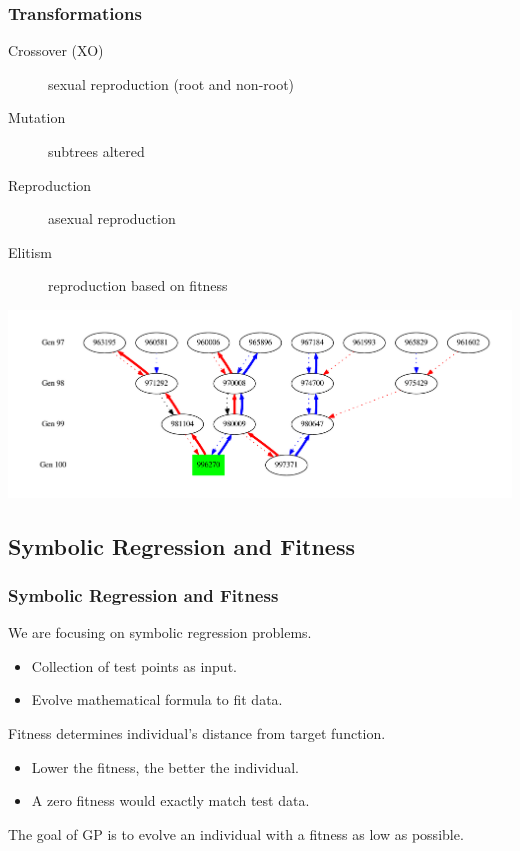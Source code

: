 \documentclass{beamer}
\newcommand{\linespace}{\vskip 0.25cm}
\begin{document}
\begin{frame}
  \frametitle{Transformations}

		\begin{description}
		\item[Crossover (XO)] sexual reproduction (root and non-root)
		\item[Mutation] subtrees altered
		\item[Reproduction] asexual reproduction
		\item[Elitism] reproduction based on fitness
		\end{description}
\includegraphics[width=.95\textwidth]{XO_path_example.pdf}
\end{frame}

\subsection{Symbolic Regression and Fitness}

\begin{frame}
	\frametitle{Symbolic Regression and Fitness}
	
	We are focusing on symbolic regression problems.
	\begin{itemize}
		\item Collection of test points as input.
		\item Evolve mathematical formula to fit data.
	\end{itemize}
	
	\linespace
	
	Fitness determines individual's distance from target function.
	\begin{itemize}
		\item Lower the fitness, the better the individual.
		\item A zero fitness would exactly match test data.
	\end{itemize}
	
	\linespace 
	
	The goal of GP is to evolve an individual with a fitness as low as possible.
	
\end{frame}
\end{document}
